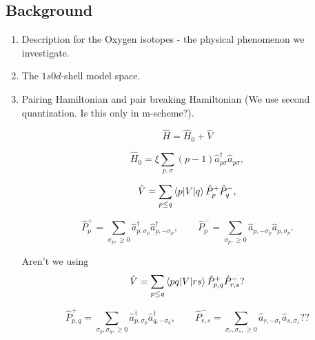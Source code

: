 \documentclass[aps,prl,reprint,groupedaddress]{revtex4-1}  %
\begin{document}
\subsection{Background}
\begin{enumerate}
	\item Description for the Oxygen isotopes - the physical phenomenon we investigate.
	\item The $1s0d$-shell model space.
	\item Pairing Hamiltonian and pair breaking Hamiltonian (We use second quantization. Is this only in m-scheme?).
	
		\begin{equation}
		\hat H = \hat H_0 + \hat V
		\end{equation}
				
		\begin{equation}
		\hat H_0 = \xi \sum_{p,\sigma} (p-1) \hat a_{p\sigma}^\dagger \hat a_{p\sigma},
		\end{equation}
		
		\begin{equation}
		\hat V = \sum_{p \leq q} \braket{p|V|q}\hat P_p^+ \hat P_q^- ,
		\end{equation}
		
		\begin{equation}
		\hat P_p^+ = \sum_{\sigma_p, \geq 0} \hat a_{p, \sigma_p}^\dagger \hat a_{p, -\sigma_p}^\dagger, \qquad
		\hat P_p^- = \sum_{\sigma_p, \geq 0} \hat a_{p, -\sigma_p} \hat a_{p, \sigma_p}.
		\end{equation}
		
		Aren't we using
		\begin{equation}
		\hat V = \sum_{p \leq q} \braket{pq|V|rs}\hat P_{p,q}^+ \hat P_{r,s}^- ?
		\end{equation}
		
		\begin{equation}
		\hat P_{p,q}^+ = \sum_{\sigma_p,\sigma_q, \geq 0} \hat a_{p, \sigma_p}^\dagger \hat a_{q, -\sigma_q}^\dagger, \qquad
		\hat P_{r,s}^- = \sum_{\sigma_r,\sigma_s, \geq 0} \hat a_{r, -\sigma_r} \hat a_{s, \sigma_s}??
		\end{equation}
\end{enumerate}
\end{document}
